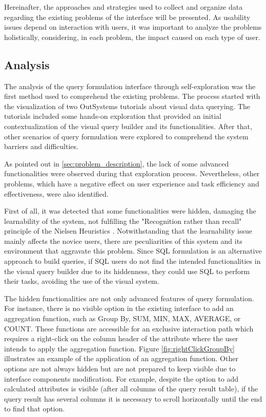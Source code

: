 Hereinafter, the approaches and strategies used to collect and organize data regarding the existing problems of the interface will be presented. As usability issues depend on interaction with users, it was important to analyze the problems holistically, considering, in each problem, the impact caused on each type of user.

\subsection{Analysis}
\label{subsec:analysis}

The analysis of the query formulation interface through self-exploration was the first method used to comprehend the existing problems. The process started with the visualization of two OutSystems tutorials \cite{outsystems_tutorial_aggregates_101, outsystems_tutorial_advanced_aggregates} about visual data querying. The tutorials included some hands-on exploration that provided an initial contextualization of the visual query builder and its functionalities. After that, other scenarios of query formulation were explored to comprehend the system barriers and difficulties.

As pointed out in \ref{sec:problem_description}, the lack of some advanced functionalities were observed during that exploration process. Nevertheless, other problems, which have a negative effect on user experience and task efficiency and effectiveness, were also identified.

First of all, it was detected that some functionalities were hidden, damaging the learnability of the system, not fulfilling the "Recognition rather than recall" principle of the Nielsen Heuristics \cite{nielsen_heuristics}. Notwithstanding that the learnability issue mainly affects the novice users, there are peculiarities of this system and its environment that aggravate this problem. Since SQL formulation is an alternative approach to build queries, if SQL users do not find the intended functionalities in the visual query builder due to its hiddenness, they could use SQL to perform their tasks, avoiding the use of the visual system.

The hidden functionalities are not only advanced features of query formulation. For instance, there is no visible option in the existing interface to add an aggregation function, such as Group By, SUM, MIN, MAX, AVERAGE, or COUNT. These functions are accessible for an exclusive interaction path which requires a right-click on the column header of the attribute where the user intends to apply the aggregation function. Figure \ref{fig:rightClickGroupBy} illustrates an example of the application of an aggregation function. Other options are not always hidden but are not prepared to keep visible due to interface components modification. For example, despite the option to add calculated attributes is visible (after all columns of the query result table), if the query result has several columns it is necessary to scroll horizontally until the end to find that option.

